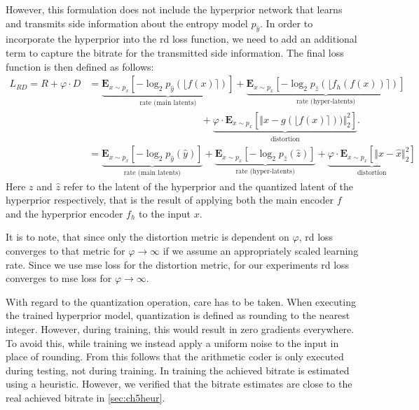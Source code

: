 However, this formulation does not include the hyperprior network that learns and transmits side information about the entropy model $p_{\hat{y}}$. In order to incorporate the hyperprior into the \ac{rd} loss function, we need to add an additional term to capture the bitrate for the transmitted side information. The final loss function is then defined as follows:
\begin{align}
L_{RD}=R + \varphi \cdot D &= \underbrace{\mathbf{E}_{x\sim p_x} [ -\log_2 p_{\hat{y}}(\lfloor f(x)\rceil)]}_\text{rate (main latents)} + 
\underbrace{\mathbf{E}_{x\sim p_x} [ -\log_2 p_{\hat{z}}(\lfloor f_h(f(x))\rceil)]}_\text{rate (hyper-latents)} \nonumber\\
&\qquad\qquad\qquad\qquad\qquad\quad\:\: + \underbrace{\varphi \cdot\mathbf{E}_{x\sim p_x} [\Vert x - g(\lfloor f(x)\rceil))\Vert^2_2]}_\text{distortion}.\nonumber\\
&=\underbrace{\mathbf{E}_{x\sim p_x} [ -\log_2 p_{\hat{y}}(\hat{y})]}_\text{rate (main latents)} + 
\underbrace{\mathbf{E}_{x\sim p_x} [ -\log_2 p_{\hat{z}}(\hat{z})]}_\text{rate (hyper-latents)} + \underbrace{\varphi \cdot\mathbf{E}_{x\sim p_x} [\Vert x - \hat{x}\Vert^2_2]}_\text{distortion}
\end{align}
Here $z$ and $\hat{z}$ refer to the latent of the hyperprior and the quantized latent of the hyperprior respectively, that is the result of applying both the main encoder $f$ and the hyperprior encoder $f_h$ to the input $x$.

It is to note, that since only the distortion metric is dependent on $\varphi$, \ac{rd} loss converges to that metric for $\varphi\rightarrow\infty$ if we assume an appropriately scaled learning rate. Since we use \ac{mse} loss for the distortion metric, for our experiments \ac{rd} loss converges to \ac{mse} loss for $\varphi\rightarrow\infty$.

With regard to the quantization operation, care has to be taken. When executing the trained hyperprior model, quantization is defined as rounding to the nearest integer. However, during training, this would result in zero gradients everywhere. To avoid this, while training we instead apply a uniform noise to the input in place of rounding. From this follows that the arithmetic coder is only executed during testing, not during training. In training the achieved bitrate is estimated using a heuristic. However, we verified that the bitrate estimates are close to the real achieved bitrate in \autoref{sec:ch5heur}.
